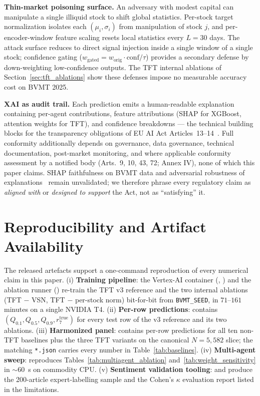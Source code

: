\documentclass[conference]{IEEEtran}
\begin{document}
\textbf{Thin-market poisoning surface.} An adversary with modest capital can manipulate a single illiquid stock to shift global statistics. Per-stock target normalization isolates each $(\mu_i, \sigma_i)$ from manipulation of stock $j$, and per-encoder-window feature scaling resets local statistics every $L=30$ days. The attack surface reduces to direct signal injection inside a single window of a single stock; confidence gating ($w_\text{gated} = w_\text{orig} \cdot \text{conf}/\tau$) provides a secondary defense by down-weighting low-confidence outputs. The TFT internal ablations of Section~\ref{sec:tft_ablations} show these defenses impose no measurable accuracy cost on BVMT 2025.

\textbf{XAI as audit trail.} Each prediction emits a human-readable explanation containing per-agent contributions, feature attributions (SHAP for XGBoost, attention weights for TFT), and confidence breakdowns --- the technical building blocks for the transparency obligations of EU AI Act Articles~13--14~\cite{ref:eu_ai_act}. Full conformity additionally depends on governance, data governance, technical documentation, post-market monitoring, and where applicable conformity assessment by a notified body (Arts.~9, 10, 43, 72; Annex IV), none of which this paper claims. SHAP faithfulness on BVMT data and adversarial robustness of explanations~\cite{ref:alvarez_melis,ref:kumar_shap} remain unvalidated; we therefore phrase every regulatory claim as \emph{aligned with} or \emph{designed to support} the Act, not as ``satisfying'' it.

\section{Reproducibility and Artifact Availability}\label{sec:repro}

The released artefacts support a one-command reproduction of every numerical claim in this paper. (i) \textbf{Training pipeline}: the Vertex-AI container (, ) and the ablation runner () re-train the TFT v3 reference and the two internal ablations (TFT $-$ VSN, TFT $-$ per-stock norm) bit-for-bit from \texttt{BVMT\_SEED}, in $71$--$161$ minutes on a single NVIDIA T4. (ii) \textbf{Per-row predictions}:  contains $(Q_{0.1}, Q_{0.5}, Q_{0.9}, r_7^\text{true})$ for every test row of the v3 reference and its two ablations. (iii) \textbf{Harmonized panel}:  contains per-row predictions for all ten non-TFT baselines plus the three TFT variants on the canonical $N=5{,}582$ slice; the matching \texttt{*.json} carries every number in Table~\ref{tab:baselines}. (iv) \textbf{Multi-agent sweep}:  reproduces Tables~\ref{tab:multiagent_ablation} and~\ref{tab:weight_sensitivity} in $\sim\!60$~s on commodity CPU. (v) \textbf{Sentiment validation tooling}:  and  produce the 200-article expert-labelling sample and the Cohen's $\kappa$ evaluation report listed in the limitations.
\end{document}
